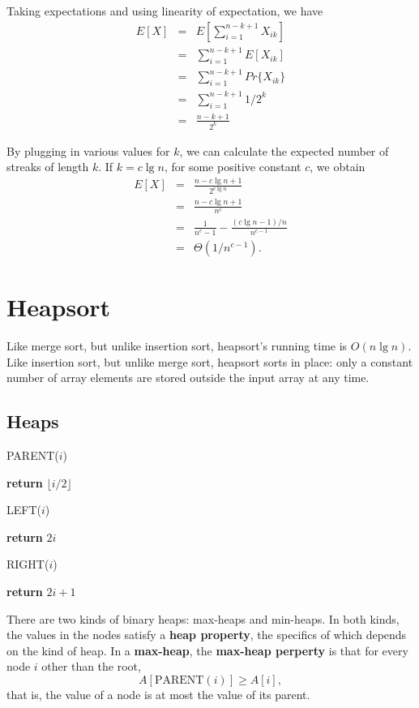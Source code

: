 \documentclass[12pt]{article}
\begin{document}
Taking expectations and using linearity of expectation, we have
\begin{eqnarray*}
  E[X]
  &=& E \left[ \sum_{i=1}^{n-k+1} X_{ik} \right] \\
  &=& \sum_{i=1}^{n-k+1} E[X_{ik}] \\
  &=& \sum_{i=1}^{n-k+1} Pr \{ X_{ik} \} \\
  &=& \sum_{i=1}^{n-k+1} 1 / 2^k \\
  &=& \frac {n-k+1}{2^k}
\end{eqnarray*}

By plugging in various values for $k$, we can calculate the expected number of streaks of length $k$. If $k = c \lg n$, for some positive constant $c$, we obtain
\begin{eqnarray*}
  E[X]
  &=& \frac {n - c \lg n + 1}{2^{c \lg n}} \\
  &=& \frac {n - c \lg n + 1}{n^c} \\
  &=& \frac {1}{n^c - 1} - \frac {(c \lg n - 1)/n}{n^{c-1}} \\
  &=& \Theta(1 / n^{c-1}).
\end{eqnarray*}

\section{Heapsort}

Like merge sort, but unlike insertion sort, heapsort's running time is $O(n \lg n)$. Like insertion sort, but unlike merge sort, heapsort sorts in place: only a constant number of array elements are stored outside the input array at any time.

\subsection{Heaps}

PARENT($i$)
\begin{algorithmic}[1]
\State \textbf {return} $\lfloor i/2 \rfloor$
\end{algorithmic}

LEFT($i$)
\begin{algorithmic}[1]
\State \textbf {return} $2i$
\end{algorithmic}

RIGHT($i$)
\begin{algorithmic}[1]
\State \textbf {return} $2i+1$
\end{algorithmic}

There are two kinds of binary heaps: max-heaps and min-heaps. In both kinds, the values in the nodes satisfy a {\bf heap property}, the specifics of which depends on the kind of heap. In a {\bf max-heap}, the {\bf max-heap perperty} is that for every node $i$ other than the root,
\begin{equation*}
  A[\text{PARENT}(i)] \ge A[i],
\end{equation*}
that is, the value of a node is at most the value of its parent. \\
\end{document}
